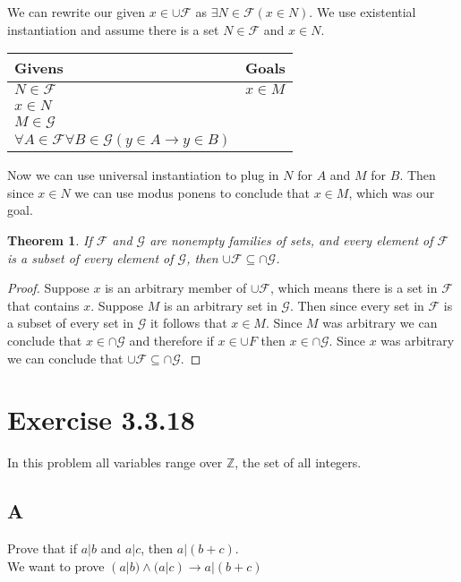 \documentclass{article}
\newcommand{\n}{ \noindent }
\newcommand{\F}{\mathcal{F}}
\newcommand{\G}{\mathcal{G}}
\newtheorem*{theorem}{Theorem}  %
\begin{document}
\n We can rewrite our given $x \in \cup \F$ as $\exists N \in \F(x \in N)$. We use existential instantiation and assume there is a set $N \in \F$ and $x \in N$.

\begin{table}[h]
\begin{tabular}{ll}
\hline
Givens & Goals   \\ \hline
$N \in \F$ & $x \in M$   \\
$x \in N$ & \\ 
$M \in \G$ & \\
$\forall A \in \F \forall B \in \G(y \in A \rightarrow y \in B)$ & \\ \hline
\end{tabular}
\end{table}

\n Now we can use universal instantiation to plug in $N$ for $A$ and $M$ for $B$. Then since $x \in N$ we can use modus ponens to conclude that $x \in M$, which was our goal.

\begin{theorem} If $\F$ and $\G$ are nonempty families of sets, and every element of $\F$ is a subset of every element of $\G$, then $\cup \F \subseteq \cap \G$.
\end{theorem}
\begin{proof}
Suppose $x$ is an arbitrary member of $\cup \F$, which means there is a set in $\F$ that contains $x$. Suppose $M$ is an arbitrary set in $\G$. Then since every set in $\F$ is a subset of every set in $\G$ it follows that $x \in M$. Since $M$ was arbitrary we can conclude that $x \in \cap \G$ and therefore if $x \in \cup F$ then $x \in \cap \G$. Since $x$ was arbitrary we can conclude that $\cup \F \subseteq \cap \G$.
\end{proof}

\section*{Exercise 3.3.18}
In this problem all variables range over $\mathbb{Z}$, the set of all integers.

\subsection*{A}
Prove that if $a | b$ and $a | c$, then $a | (b+c)$. \\

\n We want to prove
$(a|b) \land (a|c) \rightarrow a|(b+c)$ \\
\end{document}
